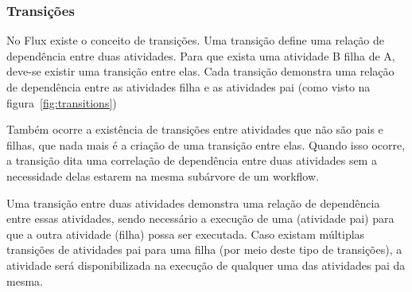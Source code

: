 \subsubsection{Transições} \label{sec:transitions}

No Flux existe o conceito de transições. Uma transição define uma relação de dependência entre duas atividades. Para que exista uma atividade B filha de A, deve-se existir uma transição entre elas. Cada transição demonstra uma relação de dependência entre as atividades filha e as atividades pai (como visto na figura~\ref{fig:transitions})

Também ocorre a existência de transições entre atividades que não são pais e filhas, que nada mais é a criação de uma transição entre elas. Quando isso ocorre, a transição dita uma correlação de dependência entre duas atividades sem a necessidade delas estarem na mesma subárvore de um workflow.

Uma transição entre duas atividades demonstra uma relação de dependência entre essas atividades, sendo necessário a execução de uma (atividade pai) para que a outra atividade (filha) possa ser executada. Caso existam múltiplas transições de atividades pai para uma filha (por meio deste tipo de transições), a atividade será disponibilizada na execução de qualquer uma das atividades pai da mesma.

